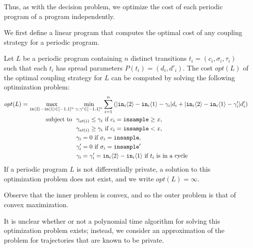 Thus, as with the decision problem, we optimize the cost of each periodic program of a program independently.

We first define a linear program that computes the optimal cost of any coupling strategy for a periodic program. 

\begin{prop}
    \label{prop:compute_opt_cost}
    Let $L$ be a periodic program containing $n$ distinct transitions $t_i = (c_i, \sigma_i, \tau_i)$ such that each $t_i$ has spread parameters $P(t_i) = (d_i, d'_i)$. The cost $opt(L)$ of the optimal coupling strategy for $L$ can be computed by solving the following optimization problem: 
    \begin{align*}
        opt(L) = \max_{\texttt{in}\langle2 \rangle-\texttt{in}\langle1 \rangle \in [-1, 1]^n} &\min_{\gamma, \gamma' \in [-1, 1]^n} \sum_{i = 1}^n \left(|\texttt{in}_i\langle2 \rangle-\texttt{in}_i\langle1 \rangle - \gamma_i| d_i + |\texttt{in}_i\langle2 \rangle-\texttt{in}_i\langle1 \rangle - \gamma_i'|d_i' \right)\\ 
            \text{subject to }
            &\ \gamma_{at(i)} \leq \gamma_i \text{ if } c_i = \texttt{insample}\geq x, \\
            &\ \gamma_{at(i)} \geq \gamma_i \text{ if } c_i = \texttt{insample} < x, \\
            &\ \gamma_i = 0 \text{ if } \sigma_i = \texttt{insample}, \\
            &\ \gamma_i' = 0 \text{ if } \sigma_i = \texttt{insample}'\\
            &\ \gamma_i = \gamma_i'= \texttt{in}_i\langle2 \rangle-\texttt{in}_i\langle1 \rangle \text{ if } t_i \text{ is in a cycle}
    \end{align*}
    If a periodic program $L$ is not differentially private, a solution to this optimization problem does not exist, and we write $opt(L) = \infty$.
\end{prop}

Observe that the inner problem is convex, and so the outer problem is that of convex maximization. 

It is unclear whether or not a polynomial time algorithm for solving this optimization problem exists; instead, we consider an approximation of the problem for trajectories that are known to be private. 


